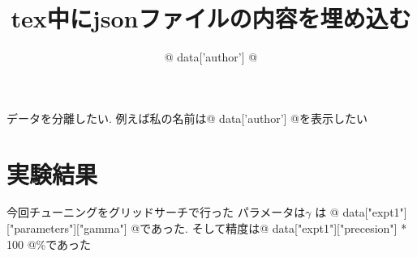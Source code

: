 \documentclass[uplatex]{jsarticle}
\begin{document}
\title{tex中にjsonファイルの内容を埋め込む} 
\author{
    {@ data['author'] @}
}
\maketitle

データを分離したい.
例えば私の名前は{@ data['author'] @}を表示したい


\section{実験結果}
今回チューニングをグリッドサーチで行った
パラメータは$\gamma$ は {@ data["expt1"]["parameters"]["gamma"] @}であった.
そして精度は{@ data["expt1"]["precesion"] * 100 @}\%であった
\end{document}
